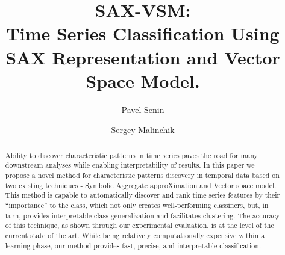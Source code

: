 \documentclass{llncs}
\begin{document}
%
\mainmatter              %
%
\title{SAX-VSM: \\Time Series Classification Using SAX Representation and Vector Space Model.}
%
%
\author{Pavel Senin
\and Sergey Malinchik
}
%
%
%


\maketitle              %

\begin{abstract}
Ability to discover characteristic patterns in time series paves the road for many
downstream analyses while enabling interpretability of results. 
In this paper we propose a novel method for characteristic patterns discovery in temporal data 
based on two existing techniques - Symbolic Aggregate approXimation and Vector space model. 
This method is capable to automatically discover and rank time series features by their
“importance” to the class, which not only creates well-performing classifiers, but, in turn,
provides interpretable class generalization and facilitates clustering. The accuracy of this
technique, as shown  through our experimental evaluation, is at the level of the current state of
the art.  
While being relatively computationally expensive within a learning phase, our method provides fast,
precise, and interpretable classification.
\end{abstract}
%
\end{document}
